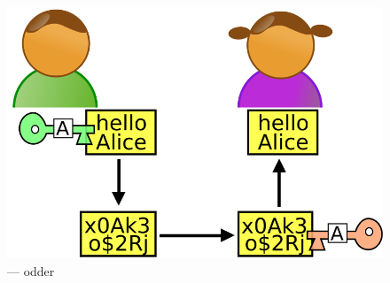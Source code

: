 \documentclass{beamer}
\begin{document}
        \begin{frame}
            \begin{center}
                \begin{figure}
                    \includegraphics[scale=0.30]{img/asymmetric.png}
                    \caption{\cc --- odder}
                \end{figure}
            \end{center}
        \end{frame}
\end{document}
